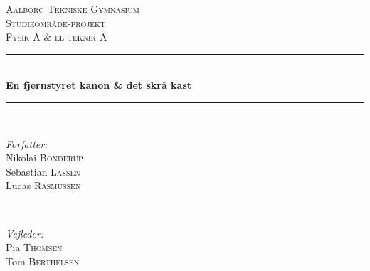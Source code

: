 


\begin{titlepage}

\newcommand{\HRule}{\rule{\linewidth}{0.5mm}} %

\center %
 

\textsc{\LARGE Aalborg Tekniske Gymnasium}\\[1.5cm] %
\textsc{\Large Studieområde-projekt}\\[0.5cm] %
\textsc{\large Fysik A \& el-teknik A}\\[0.5cm] %


\HRule \\[0.4cm]
{ \huge \bfseries En fjernstyret kanon \& det skrå kast  }\\[0.4cm] %
\HRule \\[1.5cm]
 

\begin{minipage}{0.4\textwidth}
\begin{flushleft} \large
\emph{Forfatter:}\\
Nikolai \textsc{Bonderup}\\ %
Sebastian \textsc{Lassen}\\
Lucas \textsc{Rasmussen}
\end{flushleft}
\end{minipage}
~
\begin{minipage}{0.4\textwidth}
\begin{flushright} \large
\emph{Vejleder:} \\
Pia \textsc{Thomsen}\\ %
Tom \textsc{Berthelsen}
\end{flushright}
\end{minipage}\\[2cm]


\end{titlepage}
